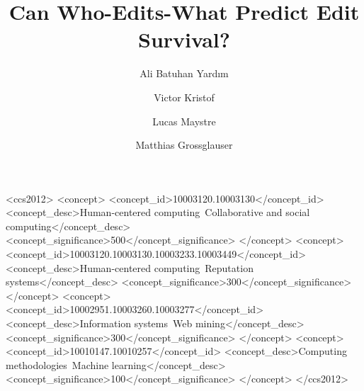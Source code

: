 \documentclass[format=sigconf]{acmart}
\begin{document}
\title{Can Who-Edits-What Predict Edit Survival?}


\author{Ali Batuhan Yardım}

\author{Victor Kristof}

\author{Lucas Maystre}

\author{Matthias Grossglauser}

\renewcommand{\shortauthors}{B. Yardım et al.}

\begin{abstract}

\end{abstract}

%
%
\begin{CCSXML}
<ccs2012>
<concept>
<concept_id>10003120.10003130</concept_id>
<concept_desc>Human-centered computing~Collaborative and social computing</concept_desc>
<concept_significance>500</concept_significance>
</concept>
<concept>
<concept_id>10003120.10003130.10003233.10003449</concept_id>
<concept_desc>Human-centered computing~Reputation systems</concept_desc>
<concept_significance>300</concept_significance>
</concept>
<concept>
<concept_id>10002951.10003260.10003277</concept_id>
<concept_desc>Information systems~Web mining</concept_desc>
<concept_significance>300</concept_significance>
</concept>
<concept>
<concept_id>10010147.10010257</concept_id>
<concept_desc>Computing methodologies~Machine learning</concept_desc>
<concept_significance>100</concept_significance>
</concept>
</ccs2012>
\end{CCSXML}





\maketitle










\end{document}
